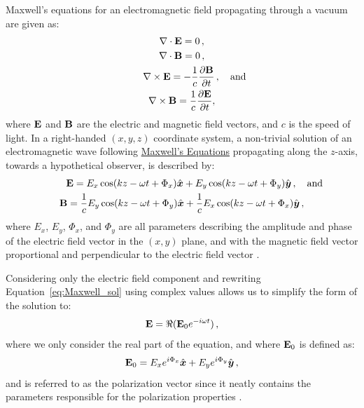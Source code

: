 Maxwell's equations for an electromagnetic field propagating through a vacuum are given as:
\begin{equation}
    \begin{gathered}
        \nabla \cdot \matr{E} = 0\,,\\
        \nabla \cdot \matr{B} = 0\,,\\
        \nabla \times \matr{E} = - \frac{1}{c} \frac{\partial \matr{B}}{\partial t}\,,\rlap{\quad and}\\
        \nabla \times \matr{B} = \frac{1}{c} \frac{\partial \matr{E}}{\partial t},
    \end{gathered}\label{eq:Maxwell}
\end{equation}
where $\mathbf{E}$ and $\mathbf{B}$ are the electric and magnetic field vectors, and $c$ is the speed of light. In a right-handed $(x, y, z)$ coordinate system, a non-trivial solution of an electromagnetic wave following \hyperref[eq:Maxwell]{Maxwell's Equations} propagating along the $z$-axis, towards a hypothetical observer, is described by:
\begin{equation}
    \begin{gathered}
        \matr{E} = E_{x} \cos(kz - \omega t + \Phi_{x}) \hat{\boldsymbol{x}} +
        E_{y} \cos(kz - \omega t + \Phi_{y}) \hat{\boldsymbol{y}}\,,\rlap{\quad and}\\
        \matr{B} = \frac{1}{c} E_{y} \cos(kz - \omega t + \Phi_{y}) \hat{\boldsymbol{x}} +
        \frac{1}{c} E_{x} \cos(kz - \omega t + \Phi_{x}) \hat{\boldsymbol{y}}\,,
    \end{gathered}\label{eq:Maxwell_sol}
\end{equation}
where $E_{x}$, $E_{y}$, $\Phi_{x}$, and $\Phi_{y}$ are all parameters describing the amplitude and phase of the electric field vector in the $(x, y)$ plane, and with the magnetic field vector proportional and perpendicular to the electric field vector \citep{Griffiths}.

Considering only the electric field component and rewriting Equation~\ref{eq:Maxwell_sol} using complex values allows us to simplify the form of the solution to:
\begin{equation}
    \mathbf{E} = \Re(\mathbf{E}_{0} e^{-i \omega t})\,,\label{eq:E_field_vector}
\end{equation}
where we only consider the real part of the equation, and where $\mathbf{E}_{0}$ is defined as:
\begin{equation}
    \mathbf{E}_{0} = E_{x} e^{i \Phi_{x}} \hat{\boldsymbol{x}} +
    E_{y} e^{i \Phi_{y}} \hat{\boldsymbol{y}}\,,\label{eq:pol_vector}
\end{equation}
and is referred to as the polarization vector since it neatly contains the parameters responsible for the polarization properties \citep{pol_phys}.


